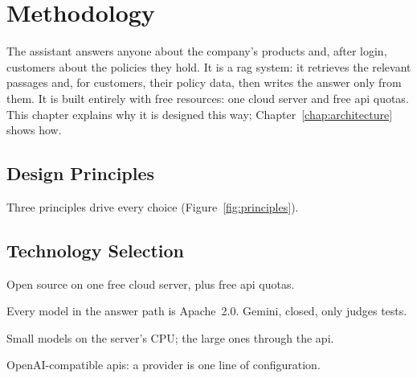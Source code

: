 \chapter{Methodology}
\label{chap:methodology}

The assistant answers anyone about the company's products and, after login, customers about the
policies they hold. It is a \ac{rag} system: it retrieves
the relevant passages and, for customers, their policy data, then writes the answer only from
them. It is built entirely with free resources: one
cloud server and free \ac{api} quotas. This chapter explains why it is designed this way;
Chapter~\ref{chap:architecture} shows how.

\section{Design Principles}
\label{sec:principles}

Three principles drive every choice (Figure~\ref{fig:principles}).



\section{Technology Selection}
\label{sec:technology-selection}

\begin{tcbraster}[raster columns=4, cardgrid]
  \begin{tcolorbox}[card]
    Open source on one free cloud server, plus free \acs{api} quotas.
  \end{tcolorbox}
  \begin{tcolorbox}[card]
    Every model in the answer path is Apache~2.0. Gemini, closed, only judges tests.
  \end{tcolorbox}
  \begin{tcolorbox}[card]
    Small models on the server's CPU; the large ones through the \acs{api}.
  \end{tcolorbox}
  \begin{tcolorbox}[card]
    OpenAI-compatible \acsp{api}: a provider is one line of configuration.
  \end{tcolorbox}
\end{tcbraster}

